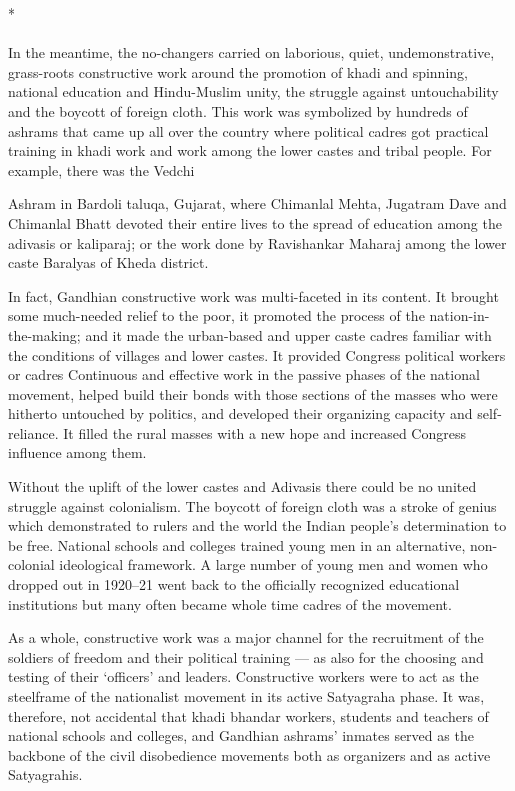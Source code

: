\begin{center}*\end{center}

\paragraph*{}


In the meantime, the no-changers carried on laborious, quiet, undemonstrative, grass-roots constructive work around the promotion of khadi and spinning, national education and Hindu-Muslim unity, the struggle against untouchability and the boycott of foreign cloth. This work was symbolized by hundreds of ashrams that came up all over the country where political cadres got practical training in khadi work and work among the lower castes and tribal people. For example, there was the Vedchi

Ashram in Bardoli taluqa, Gujarat, where Chimanlal Mehta, Jugatram Dave and Chimanlal Bhatt devoted their entire lives to the spread of education among the adivasis or kaliparaj; or the work done by Ravishankar Maharaj among the lower caste Baralyas of Kheda district.

In fact, Gandhian constructive work was multi-faceted in its content. It brought some much-needed relief to the poor, it promoted the process of the nation-in-the-making; and it made the urban-based and upper caste cadres familiar with the conditions of villages and lower castes. It provided Congress political workers or cadres Continuous and effective work in the passive phases of the national movement, helped build their bonds with those sections of the masses who were hitherto untouched by politics, and developed their organizing capacity and self-reliance. It filled the rural masses with a new hope and increased Congress influence among them.

Without the uplift of the lower castes and Adivasis there could be no united struggle against colonialism. The boycott of foreign cloth was a stroke of genius which demonstrated to rulers and the world the Indian people's determination to be free. National schools and colleges trained young men in an alternative, non-colonial ideological framework. A large number of young men and women who dropped out in 1920--21 went back to the officially recognized educational institutions but many often became whole time cadres of the movement.

As a whole, constructive work was a major channel for the recruitment of the soldiers of freedom and their political training --- as also for the choosing and testing of their `officers' and leaders. Constructive workers were to act as the steelframe of the nationalist movement in its active Satyagraha phase. It was, therefore, not accidental that khadi bhandar workers, students and teachers of national schools and colleges, and Gandhian ashrams' inmates served as the backbone of the civil disobedience movements both as organizers and as active Satyagrahis.

